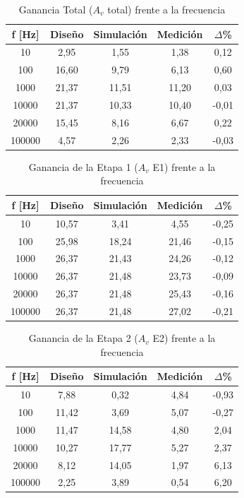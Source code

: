 \begin{table}[H]
\centering
\begin{tabular}{|c|c|c|c|c|}
\hline
\textbf{f [Hz]} & \textbf{Diseño} & \textbf{Simulación} & \textbf{Medición} & \textbf{$\Delta$\%} \\ \hline
10 & 2,95 & 1,55 & 1,38 & 0,12 \\ \hline
100 & 16,60 & 9,79 & 6,13 & 0,60 \\ \hline
1000 & 21,37 & 11,51 & 11,20 & 0,03 \\ \hline
10000 & 21,37 & 10,33 & 10,40 & -0,01 \\ \hline
20000 & 15,45 & 8,16 & 6,67 & 0,22 \\ \hline
100000 & 4,57 & 2,26 & 2,33 & -0,03 \\ \hline
\end{tabular}
\caption{Ganancia Total ($A_v$ total) frente a la frecuencia}
\label{tab:av_total}
\end{table}


\begin{table}[H]
\centering
\begin{tabular}{|c|c|c|c|c|}
\hline
\textbf{f [Hz]} & \textbf{Diseño} & \textbf{Simulación} & \textbf{Medición} & \textbf{$\Delta$\%} \\ \hline
10 & 10,57 & 3,41 & 4,55 & -0,25 \\ \hline
100 & 25,98 & 18,24 & 21,46 & -0,15 \\ \hline
1000 & 26,37 & 21,43 & 24,26 & -0,12 \\ \hline
10000 & 26,37 & 21,48 & 23,73 & -0,09 \\ \hline
20000 & 26,37 & 21,48 & 25,43 & -0,16 \\ \hline
100000 & 26,37 & 21,48 & 27,02 & -0,21 \\ \hline
\end{tabular}
\caption{Ganancia de la Etapa 1 ($A_v$ E1) frente a la frecuencia}
\label{tab:av_e1}
\end{table}


\begin{table}[H]
\centering
\begin{tabular}{|c|c|c|c|c|}
\hline
\textbf{f [Hz]} & \textbf{Diseño} & \textbf{Simulación} & \textbf{Medición} & \textbf{$\Delta$\%} \\ \hline
10 & 7,88 & 0,32 & 4,84 & -0,93 \\ \hline
100 & 11,42 & 3,69 & 5,07 & -0,27 \\ \hline
1000 & 11,47 & 14,58 & 4,80 & 2,04 \\ \hline
10000 & 10,27 & 17,77 & 5,27 & 2,37 \\ \hline
20000 & 8,12 & 14,05 & 1,97 & 6,13 \\ \hline
100000 & 2,25 & 3,89 & 0,54 & 6,20 \\ \hline
\end{tabular}
\caption{Ganancia de la Etapa 2 ($A_v$ E2) frente a la frecuencia}
\label{tab:av_e2}
\end{table}

